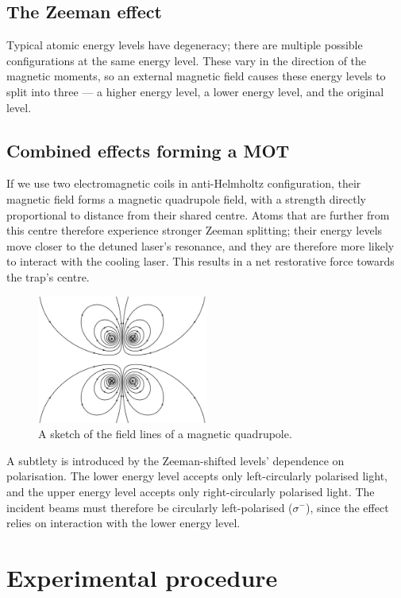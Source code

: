 \documentclass[11pt,twoside,a4paper]{article}
\begin{document}
\subsection{The Zeeman effect}
Typical atomic energy levels have degeneracy; there are multiple possible configurations at the same energy level. These vary in the direction of the magnetic moments, so an external magnetic field causes these energy levels to split into three --- a higher energy level, a lower energy level, and the original level.
\subsection{Combined effects forming a MOT}
If we use two electromagnetic coils in anti-Helmholtz configuration, their magnetic field forms a magnetic quadrupole field, with a strength directly proportional to distance from their shared centre. Atoms that are further from this centre therefore experience stronger Zeeman splitting; their energy levels move closer to
the detuned laser's resonance, and they are therefore more likely to interact with the cooling laser. This results in a net restorative force towards the trap's centre.
\begin{figure}[h]
    \centering
    \includegraphics[width=0.5\textwidth]{images/quadrupole.png}
    \caption{A sketch of the field lines of a magnetic quadrupole.~\cite{wikiquad}}
\end{figure}

A subtlety is introduced by the Zeeman-shifted levels' dependence on polarisation. The lower energy level accepts only left-circularly polarised light, and the upper energy level accepts only right-circularly polarised light. The incident beams must therefore be circularly left-polarised (\(\sigma^-\)), since the effect relies on interaction
with the lower energy level.~\cite{umkc}
\section{Experimental procedure}
\end{document}
